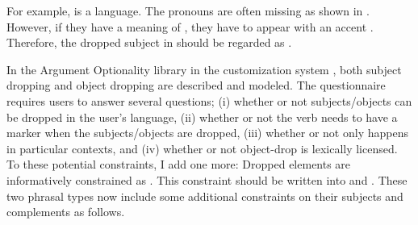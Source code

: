 For example,  is a  language.  The pronouns
are often missing as shown in
. However, if they have a meaning of
, they have to appear with an accent
\citep{cinque:77,lambrecht:96}.  Therefore, the dropped subject in
 should be regarded as
.




In the Argument Optionality library in the customization system
\citep{saleem:10,saleem:bender:10}, both subject dropping and object
dropping are described and modeled.
The questionnaire requires users
to answer several questions; (i) whether or not subjects/objects can
be dropped in the user's language, (ii) whether or not the verb needs
to have a marker when the subjects/objects are dropped, (iii) whether
or not  only happens in particular contexts, and (iv)
whether or not object-drop is lexically licensed.  To these potential
constraints, I add one more: Dropped elements are informatively
constrained as . This constraint should be written into
 and .
These two phrasal types now include some additional constraints on
their subjects and complements as follows.





